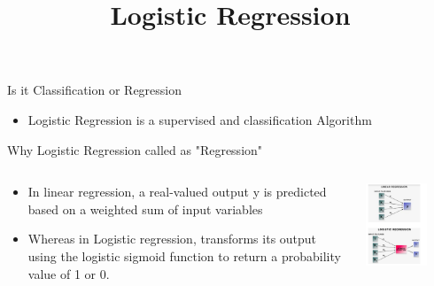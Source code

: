 \documentclass[aspectratio=169,14pt,usenames,dvipsnames]{beamer}
\title[Logistic Regression]{Logistic Regression}
\begin{document}
{\1
\begin{frame} \vspace{35pt}
	\maketitle
\end{frame}
}

\begin{frame}{Is it Classification or Regression}
\begin{itemize}
\item<2->  Logistic Regression is a supervised and classification Algorithm
\end{itemize}
\end{frame}

\begin{frame}{Why Logistic Regression called as "Regression"}
\begin{columns}
\begin{column}{0.55\textwidth}
\begin{itemize}
  \itemsep1em 
  \item In linear regression, a real-valued output y is predicted based on a weighted sum of input variables
  \item Whereas in Logistic regression, transforms its output using the logistic sigmoid function to return a probability value of 1 or 0.
\end{itemize}
\end{column}
\begin{column}{0.45\textwidth}
	\vskip-0.5cm
	\includegraphics[width=0.7\textwidth, height=0.6\textheight]{Images/AIML_LR_IMG1.png}
\end{column}
\end{columns}
\end{frame}
\end{document}
